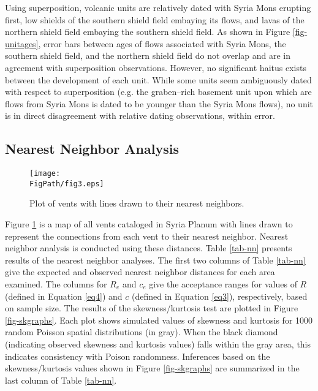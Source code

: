 Using superposition, volcanic units are relatively dated with Syria Mons erupting first, low shields of the southern shield field embaying its flows, and lavas of the northern shield field embaying the southern shield field. As shown in Figure \ref{fig-unitages}, error bars between ages of flows associated with Syria Mons, the southern shield field, and the northern shield field do not overlap and are in agreement with superposition observations. However, no significant haitus exists between the development of each unit. While some units seem ambiguously dated with respect to superposition (e.g. the graben--rich basement unit upon which are flows from Syria Mons is dated to be younger than the Syria Mons flows), no unit is in direct disagreement with relative dating observations, within error.

\subsection{Nearest Neighbor Analysis}

\begin{figure}
\centering
\texttt{[image: \\FigPath/fig3.eps]}
\caption{Plot of vents with lines drawn to their nearest neighbors.}
\label{fig-nnmap}
\end{figure}

Figure \ref{fig-nnmap} is a map of all vents cataloged in Syria Planum with lines drawn to represent the connections from each vent to their nearest neighbor. Nearest neighbor analysis is conducted using these distances. Table \ref{tab-nn} presents results of the nearest neighbor analyses. The first two columns of Table \ref{tab-nn} give the expected and observed nearest neighbor distances for each area examined. The columns for $R_e$ and $c_e$ give the acceptance ranges for values of $R$ (defined in Equation \ref{eq4}) and $c$ (defined in Equation \ref{eq3}), respectively, based on sample size. The results of the skewness/kurtosis test are plotted in Figure \ref{fig-skgraphs}. Each plot shows simulated values of skewness and kurtosis for 1000 random Poisson spatial distributions (in gray). When the black diamond (indicating observed skewness and kurtosis values) falls within the gray area, this indicates consistency with Poison randomness. Inferences based on the skewness/kurtosis values shown in Figure \ref{fig-skgraphs} are summarized in the last column of Table \ref{tab-nn}.

